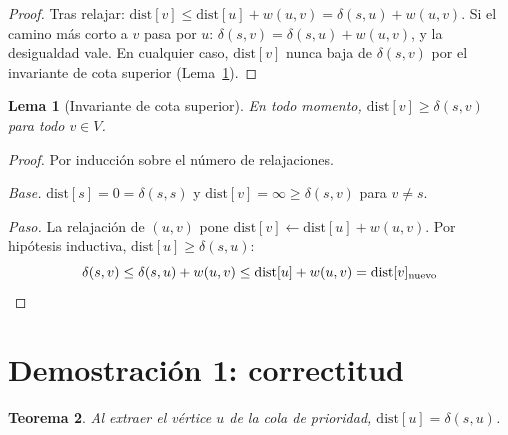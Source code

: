 \documentclass[11pt, letterpaper]{article}
\theoremstyle{definition}
\theoremstyle{plain}
\newtheorem{theorem}{Teorema}[section]
\newtheorem{lemma}[theorem]{Lema}
\theoremstyle{remark}
\begin{document}
\begin{proof}
Tras relajar:
$\mathrm{dist}[v] \leq \mathrm{dist}[u] + w(u,v)
= \delta(s,u) + w(u,v)$.
Si el camino más corto a $v$ pasa por $u$:
$\delta(s,v) = \delta(s,u) + w(u,v)$, y la desigualdad vale.
En cualquier caso, $\mathrm{dist}[v]$ nunca baja de $\delta(s,v)$
por el invariante de cota superior (Lema~\ref{lem:upper}).
\end{proof}

\begin{lemma}[Invariante de cota superior]\label{lem:upper}
En todo momento, $\mathrm{dist}[v] \geq \delta(s,v)$ para todo
$v \in V$.
\end{lemma}

\begin{proof}
Por inducción sobre el número de relajaciones.

\emph{Base.} $\mathrm{dist}[s] = 0 = \delta(s,s)$ y
$\mathrm{dist}[v] = \infty \geq \delta(s,v)$ para $v \neq s$.
\checkmark

\emph{Paso.} La relajación de $(u,v)$ pone
$\mathrm{dist}[v] \leftarrow \mathrm{dist}[u] + w(u,v)$.
Por hipótesis inductiva, $\mathrm{dist}[u] \geq \delta(s,u)$:
\[
  \delta(s,v) \leq \delta(s,u) + w(u,v)
  \leq \mathrm{dist}[u] + w(u,v)
  = \mathrm{dist}[v]_{\text{nuevo}} \qedhere
\]
\end{proof}

\section{Demostración 1: correctitud}

\begin{theorem}\label{thm:correctness}
Al extraer el vértice $u$ de la cola de prioridad,
$\mathrm{dist}[u] = \delta(s,u)$.
\end{theorem}
\end{document}
